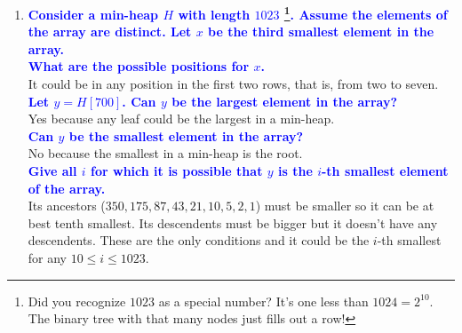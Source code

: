 \documentclass[11pt]{article}
\begin{document}
\begin{enumerate}
\item \textbf{\textcolor{blue}{Consider a min-heap $H$ with length $1023$
\footnote{Did you recognize $1023$ as a special number? It's one less 
than $1024=2^{10}$. The binary tree with that many nodes just fills 
out a row!}.
Assume the elements of the array are distinct. Let $x$ be the third 
smallest element in the array.}}
\\ \textbf{\textcolor{blue}{What are the possible positions for $x$.}}
    \\ It could be in any position in the first two rows, that is, from
    two to seven.
\\ \textbf{\textcolor{blue}{Let $y=H[700]$. Can $y$ be the largest element in the array?}}
    \\ Yes because any leaf could be the largest in a min-heap.
\\ \textbf{\textcolor{blue}{Can $y$ be the smallest element in the array?}}
    \\ No because the smallest in a min-heap is the root.
\\ \textbf{\textcolor{blue}{Give all $i$ for which it is possible that $y$ is the $i$-th smallest element of the array.}}
    \\ Its ancestors ($350,175,87,43,21,10,5,2,1$) must be smaller
       so it can be at best tenth smallest.  Its descendents must be
       bigger but it doesn't have any descendents. These are the only
       conditions and it could be the $i$-th smallest for any 
       $10\leq i\leq 1023$.


\end{enumerate}
\end{document}
